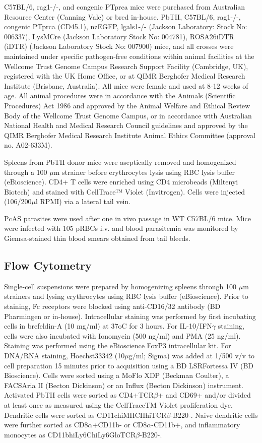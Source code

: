 \begin{sloppypar}
C57BL/6, rag1-/-, and congenic PTprca mice were purchased from Australian Resource Center (Canning Vale) or bred in-house. PbTII, C57BL/6, rag1-/-, congenic PTprca (CD45.1), nzEGFP, lgals1-/- (Jackson Laboratory: Stock No: 006337), LysMCre (Jackson Laboratory Stock No: 004781), ROSA26iDTR (iDTR) (Jackson Laboratory Stock No: 007900) mice, and all crosses were maintained under specific pathogen-free conditions within animal facilities at the Wellcome Trust Genome Campus Research Support Facility (Cambridge, UK), registered with the UK Home Office, or at QIMR Berghofer Medical Research Institute (Brisbane, Australia). All mice were female and used at 8-12 weeks of age. All animal procedures were in accordance with the Animals (Scientific Procedures) Act 1986 and approved by the Animal Welfare and Ethical Review Body of the Wellcome Trust Genome Campus, or in accordance with Australian National Health and Medical Research Council guidelines and approved by the QIMR Berghofer Medical Research Institute Animal Ethics Committee (approval no. A02-633M).
\end{sloppypar}

Spleens from PbTII donor mice were aseptically removed and homogenized through a 100 \( \mu \)m strainer before erythrocytes lysis using RBC lysis buffer (eBioscience). CD4+ T cells were enriched using CD4 microbeads (Miltenyi Biotech) and stained with CellTrace™ Violet (Invitrogen). Cells were injected (106/200\( \mu \)l RPMI) via a lateral tail vein.

PcAS parasites were used after one in vivo passage in WT C57BL/6 mice. Mice were infected with 105 pRBCs i.v. and blood parasitemia was monitored by Giemsa-stained thin blood smears obtained from tail bleeds.

\subsection{Flow Cytometry}

Single-cell suspensions were prepared by homogenizing spleens through 100 \( \mu \)m strainers and lysing erythrocytes using RBC lysis buffer (eBioscience). Prior to staining, Fc receptors were blocked using anti-CD16/32 antibody (BD Pharmingen or in-house). Intracellular staining was performed by first incubating cells in brefeldin-A (10 mg/ml) at 37oC for 3 hours. For IL-10/IFN\( \gamma \) staining, cells were also incubated with Ionomycin (500 ng/ml) and PMA (25 ng/ml). Staining was performed using the eBioscience FoxP3 intracellular kit. For DNA/RNA staining, Hoechst33342 (10\( \mu \)g/ml; Sigma) was added at 1/500 v/v to cell preparation 15 minutes prior to acquisition using a BD LSRFortessa IV (BD Bioscience). Cells were sorted using a MoFlo XDP (Beckman Coulter), a FACSAria II (Becton Dickinson) or an Influx (Becton Dickinson) instrument. Activated PbTII cells were sorted as CD4+TCR\( \beta \)+ and CD69+ and/or divided at least once as measured using the CellTraceTM Violet proliferation dye. Dendritic cells were sorted as CD11chiMHCIIhiTCR\( \beta \)-B220-. Naive dendritic cells were further sorted as CD8\( \alpha \)+CD11b- or CD8\( \alpha \)-CD11b+, and inflammatory monocytes as CD11bhiLy6ChiLy6GloTCR\( \beta \)-B220-.

